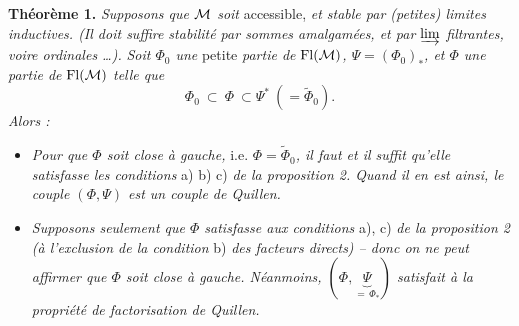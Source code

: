\setcounter{footnote}{4}

\textbf{Théorème 1.} \textit{Supposons que $\mathcal{M}$ soit} accessible, \textit{et stable par (petites) limites inductives. (Il doit suffire stabilité par sommes amalgamées, et par $\varinjlim$ filtrantes, voire ordinales \dots).} \textit{Soit $\Phi_0$ une} petite \textit{partie de} $\mathrm{Fl}(\mathcal{M})$\textit{, $\Psi=(\Phi_0)_*$, et $\Phi$ une partie de} $\mathrm{Fl}(\mathcal{M})$ \textit{telle que}
\[
\Phi_0\ \subset\ \Phi\ \subset\Psi^*\ (=\widetilde{\Phi}_0).
\]
\textit{Alors :}

\begin{itemize}[leftmargin=2.5em]
\item[a)] \textit{Pour que $\Phi$ soit close à gauche,} i.e. $\Phi=\widetilde{\Phi}_0$\textit{, il faut et il suffit qu'elle satisfasse les conditions} a) b) c) \textit{de la proposition 2. Quand il en est ainsi, le couple $(\Phi,\Psi)$ est un couple de Quillen.}

\item[b)] \textit{Supposons seulement que $\Phi$ satisfasse aux conditions} a), c) \textit{de la proposition 2 (à l'exclusion de la condition} b) \textit{des facteurs directs) – donc on ne peut affirmer que $\Phi$ soit close à gauche. Néanmoins, $(\Phi,\underbrace{\Psi}_{=\,\Phi_*})$ satisfait à la propriété de factorisation de Quillen.}
\end{itemize}

